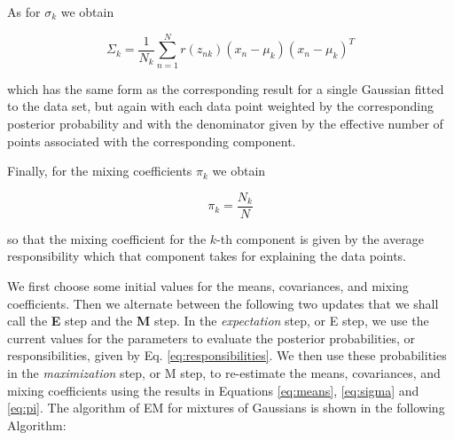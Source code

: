 \documentclass[]{book}
\theoremstyle{definition}
\theoremstyle{definition}
\theoremstyle{definition}
\theoremstyle{remark}
\begin{document}
As for \(\sigma_k\) we obtain

\begin{equation}
\label{eq:sigma}
\Sigma_k= \frac{1}{N_k} \sum_{n=1}^{N} r(z_{nk}) (x_n - \mu_k)(x_n - \mu_k)^T
\end{equation}

which has the same form as the corresponding result for a single
Gaussian fitted to the data set, but again with each data point weighted
by the corresponding posterior probability and with the denominator
given by the effective number of points associated with the
corresponding component.

Finally, for the mixing coefficients \(\pi_k\) we obtain

\begin{equation}
\label{eq:pi}
\pi_k=\frac{N_k}{N}
\end{equation}

so that the mixing coefficient for the \(k\)-th component is given by
the average responsibility which that component takes for explaining the
data points.

We first choose some initial values for the means, covariances, and
mixing coefficients. Then we alternate between the following two updates
that we shall call the \textbf{E} step and the \textbf{M} step. In the
\emph{expectation} step, or E step, we use the current values for the
parameters to evaluate the posterior probabilities, or responsibilities,
given by Eq. \eqref{eq:responsibilities}. We then use these probabilities
in the \emph{maximization} step, or M step, to re-estimate the means,
covariances, and mixing coefficients using the results in Equations
\eqref{eq:means}, \eqref{eq:sigma} and \eqref{eq:pi}. The algorithm of EM for
mixtures of Gaussians is shown in the following Algorithm:
\end{document}
